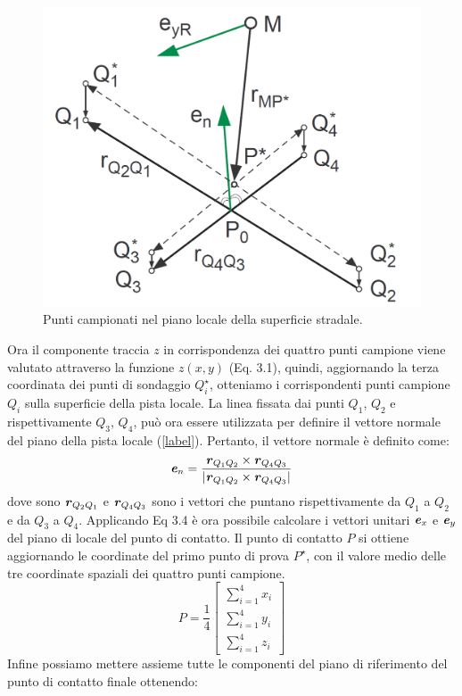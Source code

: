 \begin{figure}[h]
	\centering
	\includegraphics[width=0.5\linewidth]{Figures/local_track}
	\caption{Punti campionati nel piano locale della superficie stradale.}
	\label{localtrack}
\end{figure}
%
\noindent
Ora il componente traccia $z$ in corrispondenza dei quattro punti campione viene valutato attraverso la funzione $z(x,y)$ (Eq. 3.1), quindi, aggiornando la terza coordinata dei punti di sondaggio $Q^\star_i$, otteniamo i corrispondenti punti campione $Q_i$ sulla superficie della pista locale. La linea fissata dai punti $Q_1$, $Q_2$ e rispettivamente $Q_3$, $Q_4$, può ora essere utilizzata per definire il vettore normale del piano della pista locale (\figurename \ref{label}). Pertanto, il vettore normale è definito come:
%
\begin{equation}
\textbf{\textit{e}}_n = \frac{\textbf{\textit{r}}_{Q_1 Q_2} \times \textbf{\textit{r}}_{Q_4 Q_3}}{|\textbf{\textit{r}}_{Q_1 Q_2} \times \textbf{\textit{r}}_{Q_4 Q_3}|}
\end{equation}
%
dove sono $\textbf{\textit{r}}_{Q_2 Q_1}$ e $\textbf{\textit{r}}_{Q_4 Q_3}$ sono i vettori che puntano rispettivamente da $Q_1$ a $Q_2$ e da $Q_3$ a $Q_4$. Applicando Eq 3.4 è ora possibile calcolare i vettori unitari $\textbf{\textit{e}}_{x}$ e $\textbf{\textit{e}}_{y}$ del piano di locale del punto di contatto. Il punto di contatto $P$ si ottiene aggiornando le coordinate del primo punto di prova $P^\star$, con il valore medio delle tre coordinate spaziali dei quattro punti campione.
%
\begin{equation}
P = \frac{1}{4}\begin{bmatrix}
\sum_{i=1}^{4} x_i \\
\sum_{i=1}^{4} y_i \\
\sum_{i=1}^{4} z_i
\end{bmatrix}
\end{equation}
%
Infine possiamo mettere assieme tutte le componenti del piano di riferimento del punto di contatto finale ottenendo:

